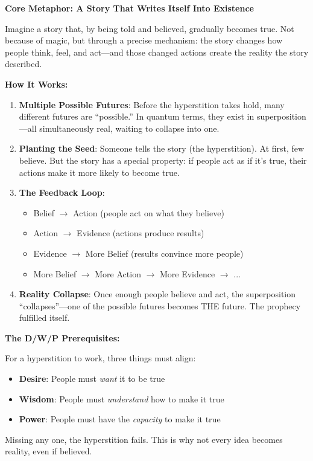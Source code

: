 \begin{tcolorbox}[colback=green!5!white,colframe=green!65!black,title=\textbf{Plain English: The Self-Writing Story},breakable]

\textbf{Core Metaphor: A Story That Writes Itself Into Existence}

Imagine a story that, by being told and believed, gradually becomes true. Not because of magic, but through a precise mechanism: the story changes how people think, feel, and act---and those changed actions create the reality the story described.

\textbf{How It Works:}

\begin{enumerate}
    \item \textbf{Multiple Possible Futures}: Before the hyperstition takes hold, many different futures are ``possible.'' In quantum terms, they exist in superposition---all simultaneously real, waiting to collapse into one.

    \item \textbf{Planting the Seed}: Someone tells the story (the hyperstition). At first, few believe. But the story has a special property: if people act as if it's true, their actions make it more likely to become true.

    \item \textbf{The Feedback Loop}:
    \begin{itemize}
        \item Belief $\to$ Action (people act on what they believe)
        \item Action $\to$ Evidence (actions produce results)
        \item Evidence $\to$ More Belief (results convince more people)
        \item More Belief $\to$ More Action $\to$ More Evidence $\to$ ...
    \end{itemize}

    \item \textbf{Reality Collapse}: Once enough people believe and act, the superposition ``collapses''---one of the possible futures becomes THE future. The prophecy fulfilled itself.
\end{enumerate}

\textbf{The D/W/P Prerequisites:}

For a hyperstition to work, three things must align:
\begin{itemize}
    \item \textbf{Desire}: People must \emph{want} it to be true
    \item \textbf{Wisdom}: People must \emph{understand} how to make it true
    \item \textbf{Power}: People must have the \emph{capacity} to make it true
\end{itemize}
Missing any one, the hyperstition fails. This is why not every idea becomes reality, even if believed.


\end{tcolorbox}
